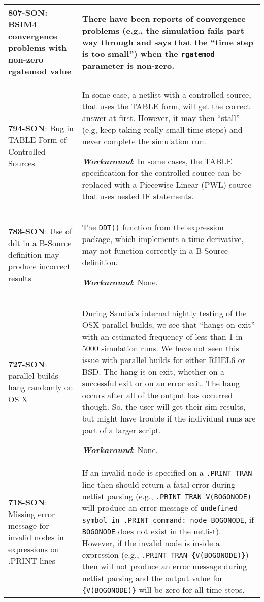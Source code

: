 {\begin{longtable}[h] {>{\raggedright\small}m{2in}|>{\raggedright\let\\\tabularnewline\small}m{3.5in}}
\textbf{807-SON}: BSIM4 convergence problems with non-zero rgatemod value &
There have been reports of convergence problems (e.g., the \Xyce{} simulation
fails part way through and says that the ``time step is too small'')  when the 
\texttt{rgatemod} parameter is non-zero. \\ \hline

\textbf{794-SON}: Bug in TABLE Form of \Xyce{} Controlled Sources & In some case, a \Xyce{}
netlist with a controlled source, that uses the TABLE form, will get the correct answer 
at first.  However, it may then ``stall'' (e.g, keep taking really small time-steps)
and never complete the simulation run.  

\textbf{\textit{Workaround}}: In some cases, the TABLE specification for the controlled
source can be replaced with a Piecewise Linear (PWL) source that uses nested IF 
statements. \\ \hline

\textbf{783-SON}: Use of ddt in a B-Source definition may produce incorrect results  & The \texttt{DDT()} 
function from the \Xyce{} expression package, which implements a time derivative, may not function 
correctly in a B-Source definition.

\textbf{\textit{Workaround}}: None. \\ \hline

\textbf{727-SON}: \Xyce{} parallel builds hang randomly on OS X & During Sandia's internal 
nightly testing of the OSX parallel builds, we see that \Xyce{} ``hangs on exit'' with an 
estimated frequency of less than 1-in-5000 simulation runs.  We have not seen this issue 
with parallel builds for either RHEL6 or BSD.  The hang is on exit, whether on a successful 
exit or on an error exit.  The hang occurs after all of the \Xyce{} output has occurred though.  
So, the user will get their sim results, but might have trouble if the individual \Xyce{} runs 
are part of a larger script.

\textbf{\textit{Workaround}}: None. \\ \hline

\textbf{718-SON}: Missing error message for invalid nodes in expressions on .PRINT lines & If an invalid node
is specified on a \Xyce{} \texttt{.PRINT TRAN} line then \Xyce{} should return a fatal error during netlist
parsing (e.g., \texttt{.PRINT TRAN V(BOGONODE)} will produce an error message of \texttt{undefined 
symbol in .PRINT command: node BOGONODE}, if \texttt{BOGONODE} does not exist in the netlist).  However, if the
invalid node is inside a \Xyce{} expression (e.g., \texttt{.PRINT TRAN \{V(BOGONODE)\}}) then \Xyce{} will 
not produce an error message during netlist parsing and the output value for \texttt{\{V(BOGONODE)\}} will 
be zero for all time-steps.


\end{longtable}}
